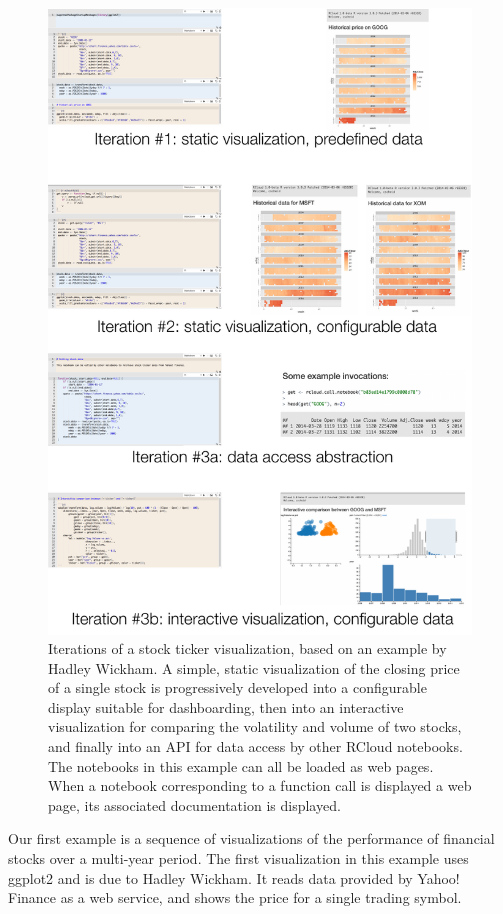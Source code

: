 \begin{figure}
\includegraphics[width=\linewidth]{fig/casestudy1/casestudy1.pdf}
\caption{\label{sec:stockvis}Iterations of a stock ticker
  visualization, based on an example by Hadley Wickham. A
  simple, static visualization of the closing price of a single stock
  is progressively developed into a configurable display suitable
  for dashboarding, then into an interactive visualization for 
  comparing the volatility and volume of two stocks, and finally
  into an API for data access by other RCloud notebooks. The notebooks
  in this example can all be loaded as web pages. When a notebook
  corresponding to a function call is displayed a web page,
  its associated documentation is displayed.}
\end{figure}

Our first example is a sequence of visualizations of the performance
of financial stocks over a multi-year period. The first visualization
in this example uses ggplot2 and is due to Hadley Wickham. It reads
data provided by Yahoo! Finance as a web service, and shows the price
for a single trading symbol.

